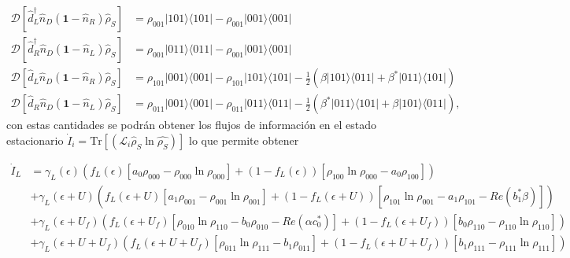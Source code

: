 \begin{appendixs}
\begin{align*}
    \mathcal{D}[\hat{d}^{\dagger}_{L}\hat{n}_{D}(\textbf{1}-\hat{n}_{R})\hat{\rho}_{S}] & = \rho_{001}|101\rangle \langle 101| - \rho_{001}|001\rangle \langle 001| \\ 
    \mathcal{D}[\hat{d}^{\dagger}_{R}\hat{n}_{D}(\textbf{1}-\hat{n}_{L})\hat{\rho}_{S}] & = \rho_{001}|011\rangle \langle 011| - \rho_{001}|001\rangle \langle 001| \\  
    \mathcal{D}[\hat{d}_{L}\hat{n}_{D}(\textbf{1}-\hat{n}_{R})\hat{\rho}_{S}] & = \rho_{101}|001\rangle \langle 001| - \rho_{101}|101\rangle \langle 101| - \frac{1}{2}(\beta |101\rangle \langle 011| + \beta^{*}|011\rangle \langle 101| ) \\ 
    \mathcal{D}[\hat{d}_{R}\hat{n}_{D}(\textbf{1}-\hat{n}_{L})\hat{\rho}_{S}] & = \rho_{011}|001\rangle \langle 001| - \rho_{011}|011\rangle \langle 011| - \frac{1}{2}(\beta^{*} |011\rangle \langle 101| + \beta|101\rangle \langle 011|  ),   
\end{align*}
con estas cantidades se podrán obtener los flujos de información en el estado estacionario $\dot{I}_{i} = \text{Tr}[(\mathcal{L}_{i}\hat{\rho}_{S} \ln \hat{\rho_{S}}) ]$ lo que permite obtener

\begin{align*}
    \dot{I}_{L} &  =  \gamma_{L}(\epsilon)(f_{L}(\epsilon)[a_{0}\rho_{000} - \rho_{000}\ln \rho_{000}] + (1-f_{L}(\epsilon))[\rho_{100}\ln \rho_{000} - a_{0}\rho_{100} ] )  \\ 
      & + \gamma_{L}(\epsilon + U)(f_{L}(\epsilon + U)[a_{1}\rho_{001} - \rho_{001}\ln \rho_{001}] + (1-f_{L}(\epsilon + U))[\rho_{101}\ln \rho_{001} -a_{1}\rho_{101} - Re(b^{*}_{1}\beta ) ]   ) \\  
      & + \gamma_{L}(\epsilon + U_{f})( f_{L}(\epsilon + U_{f})[\rho_{010}\ln \rho_{110} -b_{0}\rho_{010} - Re(\alpha c^{*}_{0}) ]  + (1-f_{L}(\epsilon + U_{f}))[b_{0}\rho_{110} - \rho_{110}\ln \rho_{110} ] ) \\  
      & + \gamma_{L}(\epsilon + U + U_{f})( f_{L}(\epsilon + U + U_{f})[\rho_{011}\ln \rho_{111}- b_{1}\rho_{011}] + (1-f_{L}(\epsilon+U+U_{f}) )[b_{1}\rho_{111} - \rho_{111}\ln \rho_{111}]  ) 
\end{align*}


\end{appendixs}
